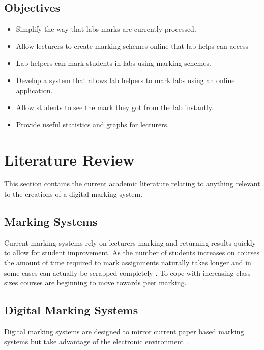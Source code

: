 \documentclass[12pt]{article}  %
\begin{document}
\subsection{Objectives}
\begin{itemize}
\item Simplify the way that labs marks are currently processed.
\item Allow lecturers to create marking schemes online that lab helps can access
\item Lab helpers can mark students in labs using marking schemes.
\item Develop a system that allows lab helpers to mark labs using an online application.
\item Allow students to see the mark they got from the lab instantly.
\item Provide useful statistics and graphs for lecturers.
\end{itemize}




\newpage
\section{Literature Review}
This section contains the current academic literature relating to anything relevant to the creations of a digital marking system.


\subsection {Marking Systems}
Current marking systems rely on lecturers marking and returning results quickly to allow for student improvement. As the number of students increases on courses the amount of time required to mark assignments naturally takes longer and in some cases can actually be scrapped completely \cite{brown_assessment_1999}. To cope with increasing class sizes courses are beginning to move towards peer marking.


\subsection{Digital Marking Systems}
Digital marking systems are designed to mirror current paper based marking systems but take advantage of the electronic environment .
\end{document}
